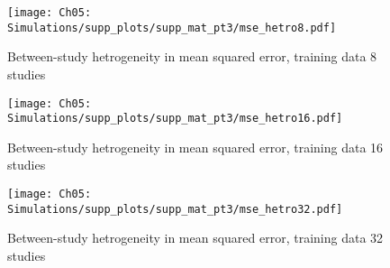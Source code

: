 \begin{figure}[H]
  \centering
  \texttt{[image: Ch05: Simulations/supp\_plots/supp\_mat\_pt3/mse\_hetro8.pdf]}
  \caption{Between-study hetrogeneity in mean squared error, training data 8 studies}
\end{figure}

\begin{figure}[H]
  \centering
  \texttt{[image: Ch05: Simulations/supp\_plots/supp\_mat\_pt3/mse\_hetro16.pdf]}
  \caption{Between-study hetrogeneity in mean squared error, training data 16 studies}
\end{figure}

\begin{figure}[H]
  \centering
  \texttt{[image: Ch05: Simulations/supp\_plots/supp\_mat\_pt3/mse\_hetro32.pdf]}
  \caption{Between-study hetrogeneity in mean squared error, training data 32 studies}
\end{figure}


